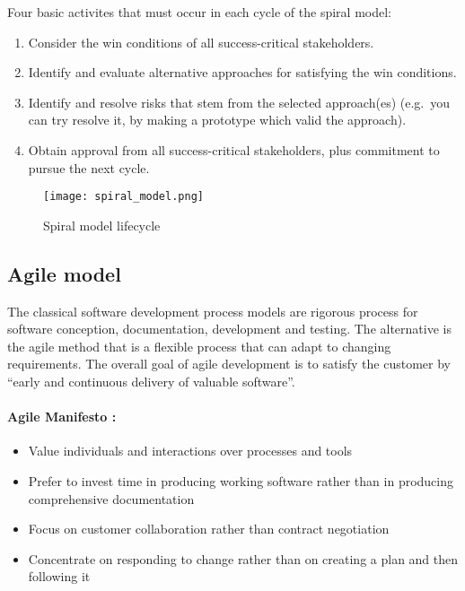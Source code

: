 Four basic activites that must occur in each cycle of the spiral model:

\begin{enumerate}
    \item Consider the win conditions of all success-critical stakeholders.
    \item Identify and evaluate alternative approaches for satisfying the win
    conditions.
    \item Identify and resolve risks that stem from the selected approach(es)
    (e.g.\ you can try resolve it, by making a prototype which valid the
    approach).
    \item Obtain approval from all success-critical stakeholders, plus
    commitment to pursue the next cycle.
\end{enumerate}

\begin{figure}[!ht]
    \centering
    \texttt{[image: spiral\_model.png]}
    \caption{Spiral model lifecycle}
\end{figure}
\FloatBarrier{}

\subsection{Agile model}
The classical software development process models are rigorous process for
software conception, documentation, development and testing. The alternative is the agile method that is a flexible process that can adapt to changing requirements. The overall goal of agile development is to satisfy the customer by \enquote{early and continuous delivery of valuable software}.

\paragraph{Agile Manifesto :\\}

\begin{itemize}
    \item Value individuals and interactions over processes and tools
    \item Prefer to invest time in producing working software rather than in producing comprehensive documentation
    \item Focus on customer collaboration rather than contract negotiation
    \item Concentrate on responding to change rather than on creating a plan and then following it
\end{itemize}


